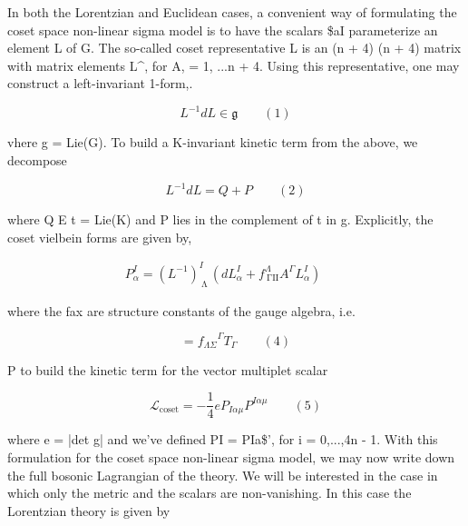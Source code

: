 \documentclass{article}
\begin{document}
\sloppy

In both the Lorentzian and Euclidean cases, a convenient way of formulating the coset
space non-linear sigma model is to have the scalars \$aI parameterize an element L of G.
The so-called coset representative L is an (n + 4)  (n + 4) matrix with matrix elements L\textasciicircum{},
for A,  = 1, ...n + 4. Using this representative, one may construct a left-invariant 1-form,.


\begin{equation}
L ^ { - 1 } d L \in \mathfrak { g } \qquad ( 1 )
\end{equation}


vhere g = Lie(G). To build a K-invariant kinetic term from the above, we decompose


\begin{equation}
L ^ { - 1 } d L = Q + P \qquad ( 2 )
\end{equation}


where Q E t = Lie(K) and P lies in the complement of t in g. Explicitly, the coset vielbein
forms are given by,


\begin{equation}
\begin{array} { r } { P _ { \alpha } ^ { I } = \left ( L ^ { - 1 } \right ) _ { \mathrm { ~ \Lambda ~ } } ^ { I } \left ( d L _ { \alpha } ^ { I } + f _ { \mathrm { ~ \Gamma I I } } ^ { \Lambda } A ^ { \Gamma } L _ { \alpha } ^ { I } \right ) \qquad }\end{array}
\end{equation}


where the fax are structure constants of the gauge algebra, i.e.


\begin{equation}
[ T _ { \Lambda }, T _ { \Sigma } ] = { f _ { \Lambda \Sigma } } ^ { \Gamma } T _ { \Gamma } \qquad ( 4 )
\end{equation}


P to build the kinetic term for the vector multiplet scalar


\begin{equation}
\mathcal { L } _ { \mathrm { c o s e t } } = - \frac { 1 } { 4 } e P _ { I \alpha \mu } P ^ { I \alpha \mu } \qquad ( 5 )
\end{equation}


where e = |det g| and we've defined PI = PIa\$', for i = 0,...,4n - 1. With this
formulation for the coset space non-linear sigma model, we may now write down the full
bosonic Lagrangian of the theory. We will be interested in the case in which only the metric
and the scalars are non-vanishing. In this case the Lorentzian theory is given by
\end{document}
